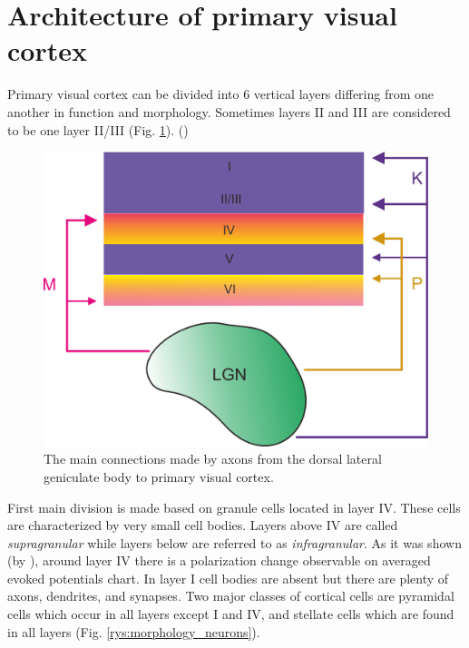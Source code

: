 \documentclass{pracalicmgr}
\begin{document}
    \section{Architecture of primary visual cortex}
     Primary visual cortex can be divided into 6 vertical layers differing from one another in function and morphology. Sometimes layers II and III are considered to be one layer II/III (Fig. \ref{rys:lgn}).
	(\cite{viola})
    \begin{figure}[H]
	\begin{center}
		\includegraphics[scale=0.4]{aga_LGN.png}
	\end{center}
	\caption{The main connections made by axons from the dorsal lateral geniculate body to primary visual cortex.}
	\label{rys:lgn}
	\end{figure}  

        First main division is made based on granule cells located in layer IV. These cells are characterized by very small cell bodies. Layers above IV are called \emph{supragranular} while layers below are referred to as \emph{infragranular}. As it was shown (by \cite{maier2010}), around layer IV there is a polarization change observable on averaged evoked potentials chart. In layer I cell bodies are absent but there are plenty of axons, dendrites, and synapses. Two major classes of cortical cells are pyramidal cells which occur in all layers except I and IV, and stellate cells which are found in all layers (Fig. \ref{rys:morphology_neurons}).
        
\end{document}
